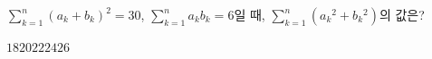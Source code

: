 \hspace*{2mm}\begin{minipage}[t]{\dimexpr\linewidth-2mm\relax}\vspace{0pt}
$\displaystyle\sum_{k=1}^{n}(a_k+b_k)^2=30$, $\displaystyle\sum_{k=1}^{n}a_kb_k=6$일 때, $\displaystyle\sum_{k=1}^{n}(a_k{}^2+b_k{}^2)$의 값은?
\begin{choices32}{$18$}{$20$}{$22$}{$24$}{$26$}\end{choices32}\end{minipage}
